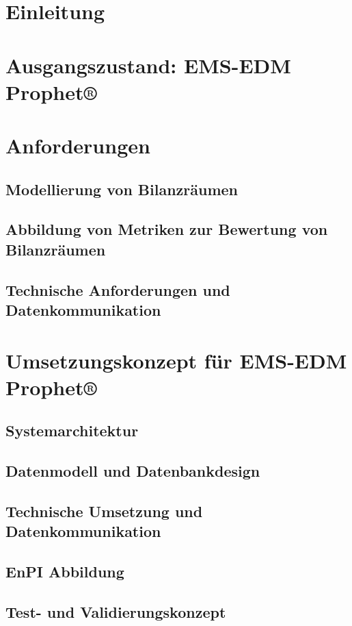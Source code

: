 \documentclass[a4paper,10pt,twoside]{report}
\begin{document}
\section{Einleitung}

\section{Ausgangszustand: EMS-EDM Prophet®}

\section{Anforderungen}
\subsection{Modellierung von Bilanzräumen}

\subsection{Abbildung von Metriken zur Bewertung von Bilanzräumen}

\subsection{Technische Anforderungen und Datenkommunikation}


\section{Umsetzungskonzept für EMS-EDM Prophet®}

\subsection{Systemarchitektur}
\subsection{Datenmodell und Datenbankdesign}
\subsection{Technische Umsetzung und Datenkommunikation}
\subsection{EnPI Abbildung}
\subsection{Test- und Validierungskonzept}
\end{document}
